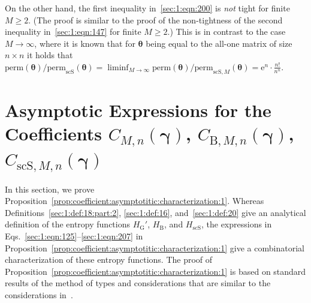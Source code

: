 \documentclass[journal,lettersize,twocolumn]{IEEEtran} %
\newcommand{\vect}[1]{ \bm{#1} }
\newcommand{\vgam}{ \vect{\gamma} }
\newcommand{\matr}[1]{ \bm{#1} }
\newcommand{\perm}{ \mathrm{perm} }
\newcommand{\permscs}{ \mathrm{perm}_{\mathrm{scS}} }
\newcommand{\permscsM}[1]{ \mathrm{perm}_{\mathrm{scS},#1} }
\newcommand{\CM}[1]{\Cgen{M}{#1}}
\newcommand{\Cgen}[2]{C_{#1,#2}}
\newcommand{\CBM}[1]{\CBgen{M}{#1}}
\newcommand{\CBgen}[2]{C_{\mathrm{B},#1,#2}}
\newcommand{\CscSgen}[2]{C_{\mathrm{scS},#1,#2}}
\newcommand{\mtheta}{\matr{\theta}}
\newcommand{\HBthe}{H_{ \mathrm{B} }}
\newcommand{\HscSthe}{H_{ \mathrm{scS} }}
\newcommand{\HG}{H_{ \mathrm{G} }}
\newcommand{\e}{\mathrm{e}}
\begin{document}
%

On the other hand, the first inequality in~\eqref{sec:1:eqn:200} is \emph{not}
tight for finite $M \geq 2$. (The proof is similar to the proof of the
non-tightness of the second inequality in~\eqref{sec:1:eqn:147} for finite
$M \geq 2$.) This is in contrast to the case $M \to \infty$, where it is known
that for $\mtheta$ being equal to the all-one matrix of size $n \times n$ it
holds that
$\perm(\mtheta) / \permscs(\mtheta) = \liminf_{M \to \infty} \perm(\mtheta) /
\permscsM{M}(\mtheta)= \e^n \cdot \frac{n!}{n^n}$.

%
%

\ifx\withclearpagecommands\x
\clearpage
\fi

\section{Asymptotic Expressions for the 
              Coefficients \texorpdfstring{$\CM{n}( \vgam )$, 
                                   $\CBM{n}( \vgam )$, $\CscSgen{M}{n}( \vgam )$}{}}
\label{sec:asymptotic:1}

%

In this section, we prove
Proposition~\ref{prop:coefficient:asymptotitic:characterization:1}. Whereas
Definitions~\ref{sec:1:def:18:part:2}, \ref{sec:1:def:16},
and~\ref{sec:1:def:20} give an analytical definition of the entropy functions
$\HG'$, $ \HBthe $, and $ \HscSthe $, the expressions in
Eqs.~\eqref{sec:1:eqn:125}--\eqref{sec:1:eqn:207} in
Proposition~\ref{prop:coefficient:asymptotitic:characterization:1} give a
combinatorial characterization of these entropy functions. The proof of
Proposition~\ref{prop:coefficient:asymptotitic:characterization:1} is based on
standard results of the method of types and considerations that are similar to
the considerations in~\cite[Sections~IV and~VII]{Vontobel2013}.

%

%
%
%
%
%
%
%

%
\end{document}
